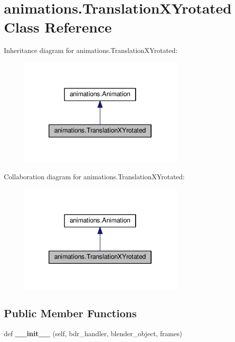 \hypertarget{classanimations_1_1TranslationXYrotated}{}\section{animations.\+Translation\+X\+Yrotated Class Reference}
\label{classanimations_1_1TranslationXYrotated}


Inheritance diagram for animations.\+Translation\+X\+Yrotated\+:\nopagebreak
\begin{figure}[H]
\begin{center}
\leavevmode
\includegraphics[width=238pt]{classanimations_1_1TranslationXYrotated__inherit__graph}
\end{center}
\end{figure}


Collaboration diagram for animations.\+Translation\+X\+Yrotated\+:\nopagebreak
\begin{figure}[H]
\begin{center}
\leavevmode
\includegraphics[width=238pt]{classanimations_1_1TranslationXYrotated__coll__graph}
\end{center}
\end{figure}
\subsection*{Public Member Functions}
\begin{DoxyCompactItemize}
\item 
def {\bfseries \+\_\+\+\_\+init\+\_\+\+\_\+} (self, bdr\+\_\+handler, blender\+\_\+object, frames)\hypertarget{classanimations_1_1TranslationXYrotated_ac8f4d6d489fc2a0d1d61c83efef61860}{}\label{classanimations_1_1TranslationXYrotated_ac8f4d6d489fc2a0d1d61c83efef61860}

\end{DoxyCompactItemize}
